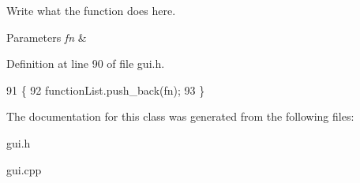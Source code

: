 Write what the function does here. 


\begin{DoxyParams}{Parameters}
{\em fn} & \\
\hline
\end{DoxyParams}


Definition at line 90 of file gui.\+h.


\begin{DoxyCode}
91     \{
92         functionList.push\_back(fn);
93     \}
\end{DoxyCode}


The documentation for this class was generated from the following files\+:\begin{DoxyCompactItemize}
\item 
gui.\+h\item 
gui.\+cpp\end{DoxyCompactItemize}
